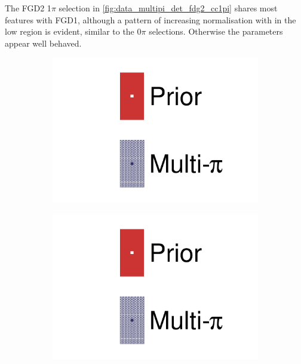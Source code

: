 The FGD2 1$\pi$ selection in \autoref{fig:data_multipi_det_fdg2_cc1pi} shares most features with FGD1, although a pattern of increasing normalisation with \pmu in the low \cosmu region is evident, similar to the 0$\pi$ selections. Otherwise the parameters appear well behaved.
\begin{figure}[h]
	\centering
	\begin{subfigure}[t]{0.32\textwidth}
		\includegraphics[width=\textwidth,page=39, trim={0mm 0mm 0mm 0mm}, clip]{figures/mach3/2018/data/2018a_FixedCov_RedCov_Mpi_Data_merge_drawPar_withDet}
	\end{subfigure}
	\begin{subfigure}[t]{0.32\textwidth}
		\includegraphics[width=\textwidth,page=40, trim={0mm 0mm 0mm 0mm}, clip]{figures/mach3/2018/data/2018a_FixedCov_RedCov_Mpi_Data_merge_drawPar_withDet}

\end{subfigure}
\end{figure}
